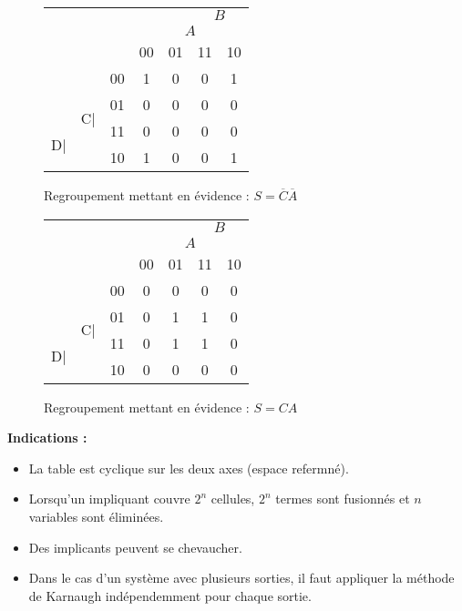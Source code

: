 \documentclass[a4paper,11pt]{book}
\theoremstyle{definition}
\theoremstyle{definition}
\begin{document}
\begin{figure}
  \centering
  \begin{tabular}{|ccc|c|c|c|c|}
    \hline
         & & & \multicolumn{2}{c}{} & \multicolumn{2}{c|}{\underline{$\:\:\:B\:\:\:$}} \\
         & & & \multicolumn{1}{c}{}& \multicolumn{2}{c}{\underline{$\:\:\:A\:\:\:$}} & \\
         & & &  00 & 01 & 11 & 10 \\
    \hline 
         & & 00 & \cellcolor{blue!25}1 & 0 & 0 & \cellcolor{blue!25}1\\
    \cline{3-7}
         & \multirow{2}{1em}{C|} & 01 & 0 & 0 & 0 & 0\\
    \cline{3-7}
         \multirow{2}{1em}{D|} & & 11 & 0 & 0 & 0 & 0\\
    \cline{3-7}
         & & 10 & \cellcolor{blue!25}1 & 0 & 0 & \cellcolor{blue!25}1\\
    \hline
  \end{tabular}
  \caption{Regroupement mettant en évidence : $S=\overline{C}\overline{A}$}
  \label{tab:karnaughEx5}
\end{figure}

\begin{figure}
  \centering
  \begin{tabular}{|ccc|c|c|c|c|}
    \hline
         & & & \multicolumn{2}{c}{} & \multicolumn{2}{c|}{\underline{$\:\:\:B\:\:\:$}} \\
         & & & \multicolumn{1}{c}{}& \multicolumn{2}{c}{\underline{$\:\:\:A\:\:\:$}} & \\
         & & &  00 & 01 & 11 & 10 \\
    \hline 
         & & 00 & 0 & 0 & 0 & 0\\
    \cline{3-7}
         & \multirow{2}{1em}{C|} & 01 & 0 & \cellcolor{blue!25}1 & \cellcolor{blue!25}1 & 0\\
    \cline{3-7}
         \multirow{2}{1em}{D|} & & 11 & 0 & \cellcolor{blue!25}1 & \cellcolor{blue!25}1 & 0\\
    \cline{3-7}
         & & 10 & 0 & 0 & 0 & 0\\
    \hline
  \end{tabular}
  \caption{Regroupement mettant en évidence : $S=CA$}
  \label{tab:karnaughEx6}
\end{figure}

\textbf{Indications :}
\begin{itemize}
    \item La table est cyclique sur les deux axes (espace refermné).
    \item Lorsqu'un impliquant couvre $2^n$ cellules, $2^n$ termes sont fusionnés et $n$ variables sont éliminées.
    \item Des implicants peuvent se chevaucher.
    \item Dans le cas d'un système avec plusieurs sorties, il faut appliquer la méthode de Karnaugh indépendemment pour chaque sortie.
\end{itemize}
\end{document}
